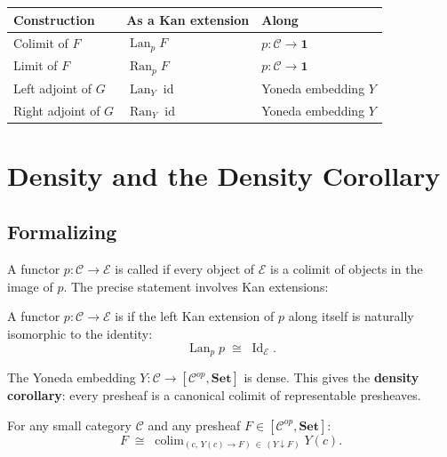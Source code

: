 \begin{center}
\renewcommand{\arraystretch}{1.4}
\begin{tabular}{lll}
\hline
\textbf{Construction} & \textbf{As a Kan extension} & \textbf{Along} \\
\hline
Colimit of $F$ & $\operatorname{Lan}_p F$  & $p : \mathcal{C} \to \mathbf{1}$ \\
Limit of $F$   & $\operatorname{Ran}_p F$  & $p : \mathcal{C} \to \mathbf{1}$ \\
Left adjoint of $G$ & $\operatorname{Lan}_Y \operatorname{id}$ & Yoneda embedding $Y$ \\
Right adjoint of $G$ & $\operatorname{Ran}_Y \operatorname{id}$ & Yoneda embedding $Y$ \\
\hline
\end{tabular}
\end{center}

\section{Density and the Density Corollary}

\subsection{Formalizing}

A functor $p : \mathcal{C} \to \mathcal{E}$ is called  if every
object of $\mathcal{E}$ is a colimit of objects in the image of $p$. The precise
statement involves Kan extensions:

\begin{definition}
A functor $p : \mathcal{C} \to \mathcal{E}$ is  if the left Kan
extension of $p$ along itself is naturally isomorphic to the identity:
\[
  \operatorname{Lan}_p p \;\cong\; \operatorname{Id}_{\mathcal{E}}.
\]
\end{definition}

The Yoneda embedding $Y : \mathcal{C} \to [\mathcal{C}^{op}, \mathbf{Set}]$ is
dense. This gives the \textbf{density corollary}: every presheaf is a canonical
colimit of representable presheaves.

\begin{theorem}
For any small category $\mathcal{C}$ and any presheaf $F \in [\mathcal{C}^{op}, \mathbf{Set}]$:
\[
  F \;\cong\; \operatorname{colim}_{(c,\, Y(c) \to F)\,\in\, (Y \downarrow F)} Y(c).
\]
\end{theorem}

